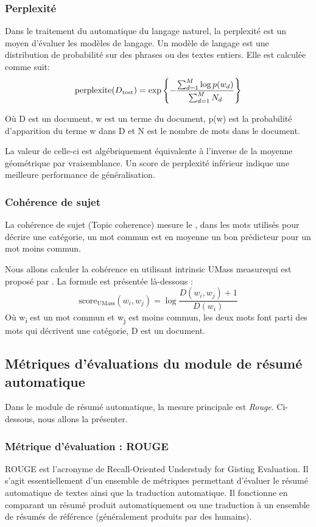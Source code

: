         \subsubsection{Perplexité}
        Dans le traitement du automatique du langage naturel, la perplexité est un moyen d'évaluer les modèles de langage. Un modèle de langage est une distribution de probabilité sur des phrases ou des textes entiers. Elle est calculée comme suit:
        \[
        \text{perplexite}(D\textsubscript{test}) =
        \exp
        \left \{-\frac{\sum_{d=1}^{M}{\log{p(w_d)}}}{\sum_{d=1}^{M}{N_d}}\right\}
        \]

        Où D est un document, w est un terme du document, p(w) est la probabilité d'apparition du terme w dans D et N est le nombre de mots dans le document.

        La valeur de celle-ci est algébriquement équivalente à l'inverse de la moyenne géométrique par vraisemblance. Un score de perplexité inférieur indique une meilleure performance de généralisation.

        \subsubsection{Cohérence de sujet}
        La cohérence de sujet (Topic coherence) mesure le , dans les mots utilisés pour décrire une catégorie, un mot commun est en moyenne un bon prédicteur pour un mot moins commun.

        Nous allons calculer la cohérence en utilisant \textquotedbl intrinsic UMass measure\textquotedbl qui est proposé par \cite{}. La formule est présentée là-dessous :
        \[
        \text{score}_{\text{UMass}}(w_i, w_j) =
        \log
        \frac{D(w_i, w_j) + 1}{D(w_i)}
        \]
        Où w\textsubscript{i} est un mot commun et w\textsubscript{j} est moins commun, les deux mots font parti des mots qui décrivent une catégorie, D est un document.

    \subsection{Métriques d'évaluations du module de résumé automatique}
    Dans le module de résumé automatique, la mesure principale est \emph{Rouge}. Ci-dessous, nous allons la présenter.

        \subsubsection{Métrique d'évaluation : ROUGE\label{metrique-eval}}
        ROUGE est l'acronyme de \textquotedbl Recall-Oriented Understudy for Gisting Evaluation\textquotedbl. Il s'agit essentiellement d'un ensemble de métriques permettant d'évaluer le résumé automatique de textes ainsi que la traduction automatique. Il fonctionne en comparant un résumé produit automatiquement ou une traduction à un ensemble de résumés de référence (généralement produits par des humains). \cite{rouge0}


